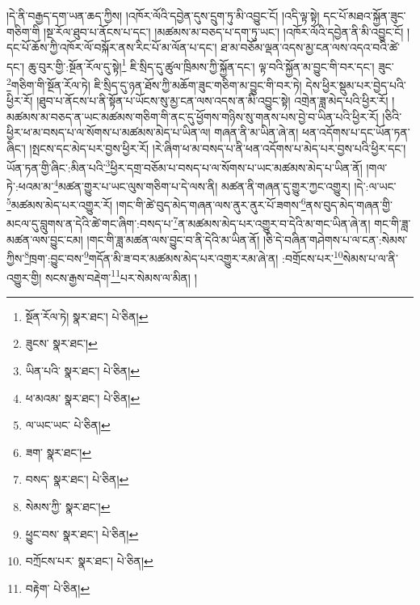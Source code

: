 །དེ་ནི་བརྒྱད་དག་ཡན་ཆད་ཀྱིས། །འཁོར་ལོའི་དབྱེན་དུས་དྲུག་ཏུ་མི་འབྱུང་ངོ། །འདི་ལྟ་སྟེ། དང་པོ་མཐའ་སྐྱོན་ཟུང་གཅིག་གི །སྔ་རོལ་ཐུབ་པ་ནོངས་པ་དང་། །མཚམས་མ་བཅད་པ་དག་ཏུ་ཡང་། །འཁོར་ལོའི་དབྱེན་ནི་མི་འབྱུང་ངོ། །དང་པོ་ཆོས་ཀྱི་འཁོར་ལོ་བསྐོར་ནས་རིང་པོ་མ་ལོན་པ་དང་། ཐ་མ་བཅོམ་ལྡན་འདས་མྱ་ངན་ལས་འདའ་བའི་ཚེ་དང་། ཆུ་བུར་གྱི་:སྔོན་རོལ་དུ་སྟེ།\footnote{སྔོན་རོལ་ཏེ།  སྣར་ཐང་།  པེ་ཅིན། } ཇི་སྲིད་དུ་ཚུལ་ཁྲིམས་ཀྱི་སྐྱོན་དང་། ལྟ་བའི་སྐྱོན་མ་བྱུང་གི་བར་དང་། ཟུང་\footnote{ཟུངས་  སྣར་ཐང་། }གཅིག་གི་སྔོན་རོལ་ཏེ། ཇི་སྲིད་དུ་ཉན་ཐོས་ཀྱི་མཆོག་ཟུང་གཅིག་མ་བྱུང་གི་བར་ཏེ། དེས་ཕྱིར་སྡུམ་པར་བྱེད་པའི་ཕྱིར་རོ། །ཐུབ་པ་ནོངས་པ་ནི་སྟོན་པ་ཡོངས་སུ་མྱ་ངན་ལས་འདས་ན་མི་འབྱུང་སྟེ། འགྲེན་ཟླ་མེད་པའི་ཕྱིར་རོ། །མཚམས་མ་བཅད་ན་ཡང་མཚམས་གཅིག་གི་ནང་དུ་ཕྱོགས་གཉིས་སུ་གནས་པས་བྱེ་བ་ཡིན་པའི་ཕྱིར་རོ། །ཅིའི་ཕྱིར་ཕ་མ་བསད་པ་ལ་སོགས་པ་མཚམས་མེད་པ་ཡིན་ལ། གཞན་ནི་མ་ཡིན་ཞེ་ན། ཕན་འདོགས་པ་དང་ཡོན་ཏན་ཞིང་། །སྤངས་དང་མེད་པར་བྱས་ཕྱིར་རོ། །རེ་ཞིག་ཕ་མ་བསད་པ་ནི་ཕན་འདོགས་པ་མེད་པར་བྱས་པའི་ཕྱིར་དང་། ཡོན་ཏན་གྱི་ཞིང་:མིན་པའི་\footnote{ཡིན་པའི་  སྣར་ཐང་།  པེ་ཅིན། }ཕྱིར་དགྲ་བཅོམ་པ་བསད་པ་ལ་སོགས་པ་ཡང་མཚམས་མེད་པ་ཡིན་ནོ། །གལ་ཏེ་:ཕའམ་མ་\footnote{ཕ་མའམ་  སྣར་ཐང་།  པེ་ཅིན། }མཚན་གྱུར་པ་ཡང་ལུས་གཅིག་པ་དེ་ལས་ནི། མཚན་ནི་གཞན་དུ་གྱུར་ཀྱང་འགྱུར། །དེ་:ལ་ཡང་\footnote{ལ་ཡང་ཡང་  པེ་ཅིན། }མཚམས་མེད་པར་འགྱུར་རོ། །གང་གི་ཚེ་བུད་མེད་གཞན་ལས་ནུར་ནུར་པོ་ཟགས་\footnote{ཟག་  སྣར་ཐང་། }ནས་བུད་མེད་གཞན་གྱི་མངལ་དུ་བླུགས་ན་དེའི་ཚེ་གང་ཞིག་:བསད་པ་\footnote{བསད་  སྣར་ཐང་།  པེ་ཅིན། }ན་མཚམས་མེད་པར་འགྱུར་བ་དེའི་མ་གང་ཡིན་ཞེ་ན། གང་གི་ཟླ་མཚན་ལས་བྱུང་ངམ། །གང་གི་ཟླ་མཚན་ལས་བྱུང་བ་ནི་དེའི་མ་ཡིན་ནོ། །ཅི་དེ་བཞིན་གཤེགས་པ་ལ་ངན་:སེམས་ཀྱིས་\footnote{སེམས་ཀྱི་  སྣར་ཐང་། }ཁྲག་:བྱུང་བས་\footnote{ཕྱུང་བས་  སྣར་ཐང་།  པེ་ཅིན། }གདོན་མི་ཟ་བར་མཚམས་མེད་པར་འགྱུར་རམ་ཞེ་ན། :བགྲོངས་པར་\footnote{བཀྲོངས་པར་  སྣར་ཐང་།  པེ་ཅིན། }སེམས་པ་ལ་ནི་འགྱུར་གྱི། སངས་རྒྱས་བརྡེག་\footnote{བརྟེག་  པེ་ཅིན། }པར་སེམས་ལ་མིན། །
